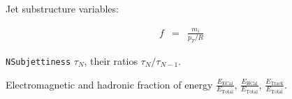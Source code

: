 Jet substructure variables:

\begin{eqnarray*}
f & = & \frac{m_{i}}{p_{T}/R}
\end{eqnarray*}

{\tt NSubjettiness} $\tau_{N}$, their ratios $\tau_{N}/\tau_{N-1}$.

Electromagnetic and hadronic fraction of energy $\frac{E_{\text{ECal}}}{E_{\text{Total}}}$,
$\frac{E_{\text{HCal}}}{E_{\text{Total}}}$, $\frac{E_{\text{Track}}}{E_{\text{Total}}}$.
